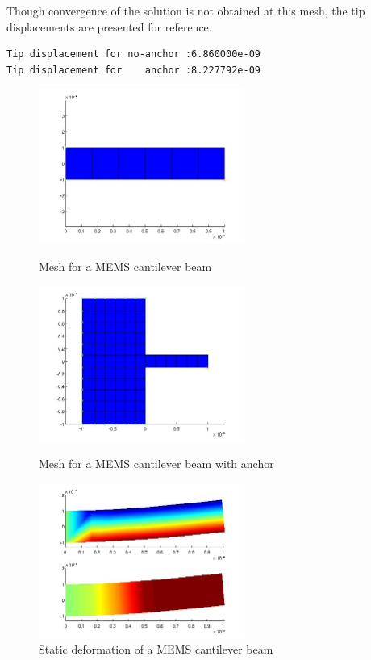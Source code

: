 Though convergence of the solution is not obtained at this
mesh, the tip displacements are presented for reference.
\begin{verbatim}
Tip displacement for no-anchor :6.860000e-09
Tip displacement for    anchor :8.227792e-09
\end{verbatim}


\begin{figure}[htbp]
\begin{minipage}{0.45\linewidth}
\includegraphics[height = 2in]{fig/mems_cant_m_mesh.jpg}
\caption{Mesh for a MEMS cantilever beam}
\label{fig:MEMSCantileverBeamMesh}
\includegraphics[height = 2in]{fig/mems_cant_wa_m_mesh.jpg}
\caption{Mesh for a MEMS cantilever beam with anchor}
\label{fig:MEMSCantileverBeamWaMesh}
\end{minipage}
\hfill
\begin{minipage}{0.45\linewidth}
\includegraphics[height = 2in]{fig/mems_cant_m_sta.jpg}
\caption{Static deformation of a MEMS cantilever beam}
\label{fig:MEMSCantileverBeamStatic}

\end{minipage}
\end{figure}
